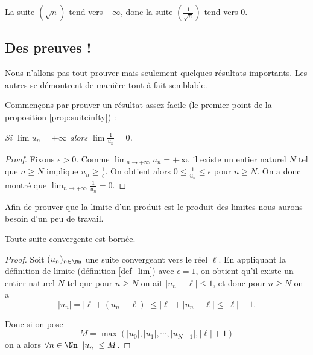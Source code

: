 \documentclass[class=report,crop=false]{standalone}
\begin{document}
\begin{exemple}
La suite $(\sqrt{n})$ tend vers $+\infty$, donc la suite $(\frac1{\sqrt{n}})$ tend vers $0$.
\end{exemple}



\subsection{Des preuves !}

Nous n'allons pas tout prouver mais seulement quelques résultats importants.
Les autres se démontrent de manière tout à fait semblable.

Commençons par prouver un résultat assez facile (le premier point de la proposition \ref{prop:suiteinfty}) :

\medskip

\centerline{\og{}\emph{Si \quad $\lim u_n = +\infty$ \quad alors \quad $\lim \frac{1}{u_n} = 0$.}\fg{}}

\begin{proof}
Fixons $\epsilon>0$. Comme $\lim_{n\to +\infty}u_n= +\infty$,
il existe un entier naturel $N$ tel que $n\ge N$ implique $u_n\ge \frac{1}{\epsilon}$.
On obtient alors $0 \le \frac{1}{u_n} \le \epsilon$ pour $n\geq N$.
On a donc montré que $\lim_{n\to +\infty}\frac{1}{u_n}= 0$.
\end{proof}

Afin de prouver que la limite d'un produit est le produit des limites
nous aurons besoin d'un peu de travail.

\begin{proposition}
Toute suite convergente est bornée.
\end{proposition}

\begin{proof}
Soit $(u_n)_{n\in \Nn}$  une suite convergeant vers le réel $\ell$. En appliquant
la définition de limite (définition \ref{def_lim}) avec $\epsilon=1$,
on obtient qu'il existe un entier naturel $N$ tel que pour $n\geq N$ on ait
$\lvert u_n-\ell \rvert \leq 1$, et donc pour $n\geq N$ on a
\[\lvert u_n \rvert =\lvert \ell+(u_n-\ell) \rvert \leq \lvert \ell \rvert + \lvert u_n-\ell  \rvert \leq \lvert \ell \rvert +1 .\]


Donc si on pose
\[ M= \max(\lvert u_0 \rvert,\lvert u_1\rvert, \cdots , \lvert u_{N-1}\rvert , \lvert \ell \rvert +1) \]
on a alors $\forall n \in \Nn\;\; \lvert u_n \rvert \leq M$.
\end{proof}
\end{document}
